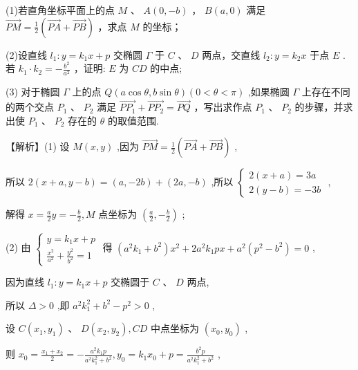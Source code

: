 \documentclass[10pt]{article}
\begin{document}
(1)若直角坐标平面上的点 \(M\) 、 \(A\left( {0, - b}\right)\) ， \(B\left( {a,0}\right)\) 满足 \(\overrightarrow{PM} = \frac{1}{2}\left( {\overrightarrow{PA} + \overrightarrow{PB}}\right)\) ，求点 \(M\) 的坐标；

(2)设直线 \({l}_{1} : y = {k}_{1}x + p\) 交椭圆 \(\Gamma\) 于 \(C\) 、 \(D\) 两点，交直线 \({l}_{2} : y = {k}_{2}x\) 于点 \(E\) . 若 \({k}_{1} \cdot  {k}_{2} =  - \frac{{b}^{2}}{{a}^{2}}\) ，证明: \(E\) 为 \({CD}\) 的中点;

(3) 对于椭圆 \(\Gamma\) 上的点 \(Q\left( {a\cos \theta ,b\sin \theta }\right) \left( {0 < \theta  < \pi }\right)\) ,如果椭圆 \(\Gamma\) 上存在不同的两个交点 \({P}_{1}\text{ 、 }{P}_{2}\) 满足 \(\overrightarrow{P{P}_{1}} + \overrightarrow{P{P}_{2}} = \overrightarrow{PQ}\) ，写出求作点 \({P}_{1}\text{ 、 }{P}_{2}\) 的步骤，并求出使 \({P}_{1}\text{ 、 }{P}_{2}\) 存在的 \(\theta\) 的取值范围.

【解析】(1) 设 \(M\left( {x,y}\right)\) ,因为 \(\overrightarrow{PM} = \frac{1}{2}\left( {\overrightarrow{PA} + \overrightarrow{PB}}\right)\) ,

所以 \(2\left( {x + a,y - b}\right)  = \left( {a, - {2b}}\right)  + \left( {{2a}, - b}\right)\) ,所以 \(\left\{  \begin{array}{l} 2\left( {x + a}\right)  = {3a} \\  2\left( {y - b}\right)  =  - {3b} \end{array}\right.\) ,

解得 \(x = \frac{a}{2}y =  - \frac{b}{2},M\) 点坐标为 \(\left( {\frac{a}{2}, - \frac{b}{2}}\right)\) ;

(2) 由 \(\left\{  \begin{array}{l} y = {k}_{1}x + p \\  \frac{{x}^{2}}{{a}^{2}} + \frac{{y}^{2}}{{b}^{2}} = 1 \end{array}\right.\) 得 \(\left( {{a}^{2}{k}_{1} + {b}^{2}}\right) {x}^{2} + 2{a}^{2}{k}_{1}{px} + {a}^{2}\left( {{p}^{2} - {b}^{2}}\right)  = 0\) ,

因为直线 \({l}_{1} : y = {k}_{1}x + p\) 交椭圆于 \(C\text{ 、 }D\) 两点,

所以 \(\Delta  > 0\) ,即 \({a}^{2}{k}_{1}^{2} + {b}^{2} - {p}^{2} > 0\) ,

设 \(C\left( {{x}_{1},{y}_{1}}\right) \text{ 、 }D\left( {{x}_{2},{y}_{2}}\right) ,{CD}\) 中点坐标为 \(\left( {{x}_{0},{y}_{0}}\right)\) ,

则 \({x}_{0} = \frac{{x}_{1} + {x}_{2}}{2} =  - \frac{{a}^{2}{k}_{1}p}{{a}^{2}{k}_{1}^{2} + {b}^{2}},{y}_{0} = {k}_{1}{x}_{0} + p = \frac{{b}^{2}p}{{a}^{2}{k}_{1}^{2} + {b}^{2}}\) ,
\end{document}
